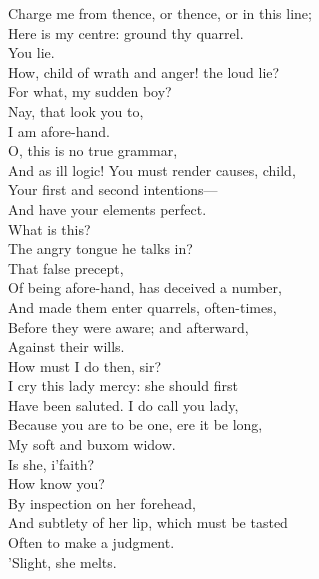 \documentclass[a4paper,oneside,12pt]{memoir}
\begin{document}
\begin{drama*}
Charge me from thence, or thence, or in this line;\\
Here is my centre: ground thy quarrel.\\
\kastrilspeaks {} You lie.\\
\subtlespeaks How, child of wrath and anger! the loud lie?\\
For what, my sudden boy?\\
\kastrilspeaks {} Nay, that look you to,\\
I am afore-hand.\\
\subtlespeaks {} O, this is no true grammar,\\
And as ill logic! You must render causes, child,\\
Your first and second intentions---\\
And have your elements perfect.\\
\kastrilspeaks {} What is this?\\
The angry tongue he talks in?\\
\subtlespeaks {} That false precept,\\
Of being afore-hand, has deceived a number,\\
And made them enter quarrels, often-times,\\
Before they were aware; and afterward,\\
Against their wills.\\
\kastrilspeaks {} How must I do then, sir?\\
\subtlespeaks I cry this lady mercy: she should first\\
Have been saluted. I do call you lady,\\
Because you are to be one, ere it be long,\\
My soft and buxom widow.\\
\kastrilspeaks {} Is she, i'faith?\\
How know you?\\
\subtlespeaks {} By inspection on her forehead,\\
And subtlety of her lip, which must be tasted\\
Often to make a judgment.\\
 'Slight, she melts.\\

\end{drama*}
\end{document}
